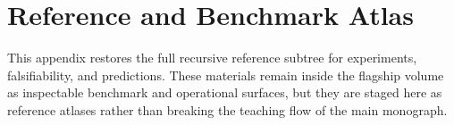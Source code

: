 \section{Reference and Benchmark Atlas}
\label{sec:oc-core-1-3-reference-benchmark-atlas}

This appendix restores the full recursive reference subtree for experiments,
falsifiability, and predictions. These materials remain inside the flagship
volume as inspectable benchmark and operational surfaces, but they are staged
here as reference atlases rather than breaking the teaching flow of the main
monograph.

\begingroup
\let\ocappendixsection\section
\let\ocappendixsubsection\subsection
\let\ocappendixsubsubsection\subsubsection
\renewcommand{\section}{\ocappendixsubsection}
\renewcommand{\subsection}{\ocappendixsubsubsection}

\endgroup
